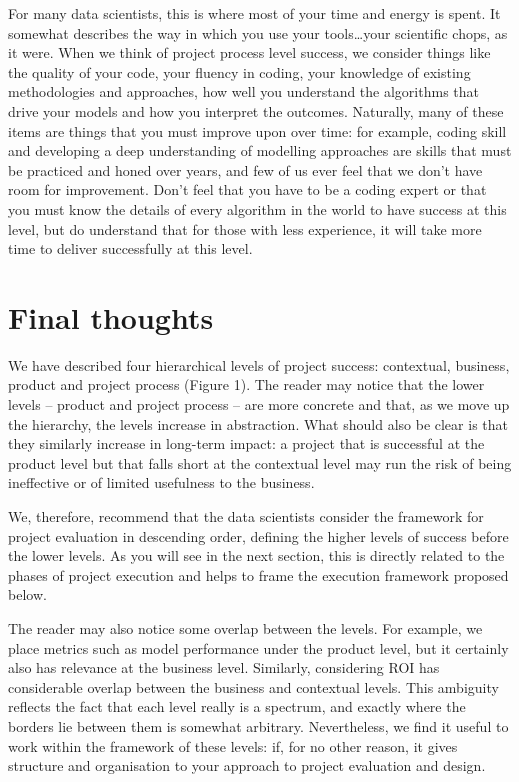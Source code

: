 \documentclass[
]{book}
\begin{document}
For many data scientists, this is where most of your time and energy is
spent. It somewhat describes the way in which you use your
tools\ldots your scientific chops, as it were. When we think of project
process level success, we consider things like the quality of your code,
your fluency in coding, your knowledge of existing methodologies and
approaches, how well you understand the algorithms that drive your
models and how you interpret the outcomes. Naturally, many of these
items are things that you must improve upon over time: for example,
coding skill and developing a deep understanding of modelling approaches
are skills that must be practiced and honed over years, and few of us
ever feel that we don't have room for improvement. Don't feel that you
have to be a coding expert or that you must know the details of every
algorithm in the world to have success at this level, but do understand
that for those with less experience, it will take more time to deliver
successfully at this level.

\hypertarget{final-thoughts}{%
\section{Final thoughts}\label{final-thoughts}}

We have described four hierarchical levels of project success:
contextual, business, product and project process (Figure 1). The reader
may notice that the lower levels -- product and project process -- are
more concrete and that, as we move up the hierarchy, the levels increase
in abstraction. What should also be clear is that they similarly
increase in long-term impact: a project that is successful at the
product level but that falls short at the contextual level may run the
risk of being ineffective or of limited usefulness to the business.

We, therefore, recommend that the data scientists consider the framework
for project evaluation in descending order, defining the higher levels
of success before the lower levels. As you will see in the next section,
this is directly related to the phases of project execution and helps to
frame the execution framework proposed below.

The reader may also notice some overlap between the levels. For example,
we place metrics such as model performance under the product level, but
it certainly also has relevance at the business level. Similarly,
considering ROI has considerable overlap between the business and
contextual levels. This ambiguity reflects the fact that each level
really is a spectrum, and exactly where the borders lie between them is
somewhat arbitrary. Nevertheless, we find it useful to work within the
framework of these levels: if, for no other reason, it gives structure
and organisation to your approach to project evaluation and design.
\end{document}
